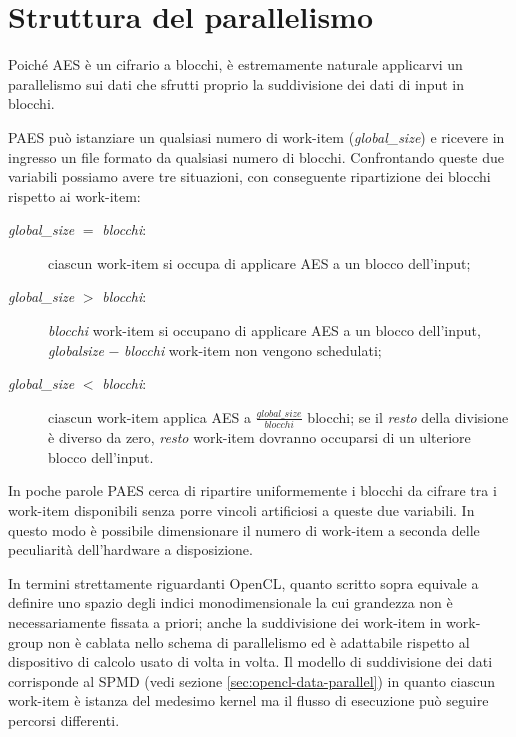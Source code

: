 \documentclass[12pt,a4paper,oneside]{book}
\begin{document}
\section{Struttura del parallelismo}
\label{sec:paes-parallelism}

Poiché \ac{AES} è un cifrario a blocchi, è estremamente naturale applicarvi un parallelismo sui dati che sfrutti proprio la suddivisione dei dati di input in blocchi.

PAES può istanziare un qualsiasi numero di work-item (\textit{global\_size}) e ricevere in ingresso un file formato da qualsiasi numero di blocchi. Confrontando queste due variabili possiamo avere tre situazioni, con conseguente ripartizione dei blocchi rispetto ai work-item:

\begin{description}
\item[\textit{global\_size} $=$ \textit{blocchi}:] ciascun work-item si occupa di applicare \ac{AES} a un blocco dell'input;
\item[\textit{global\_size} $>$ \textit{blocchi}:] \textit{blocchi} work-item si occupano di applicare \ac{AES} a un blocco dell'input, \textit{globalsize} $-$ \textit{blocchi} work-item non vengono schedulati;
\item[\textit{global\_size} $<$ \textit{blocchi}:] ciascun work-item applica \ac{AES} a $\frac{global\_size}{blocchi}$ blocchi; se il \textit{resto} della divisione è diverso da zero, \textit{resto} work-item dovranno occuparsi di un ulteriore blocco dell'input.
\end{description}

In poche parole PAES cerca di ripartire uniformemente i blocchi da cifrare tra i work-item disponibili senza porre vincoli artificiosi a queste due variabili. In questo modo è possibile dimensionare il numero di work-item a seconda delle peculiarità dell'hardware a disposizione.

In termini strettamente riguardanti \ac{OpenCL}, quanto scritto sopra equivale a definire uno spazio degli indici monodimensionale la cui grandezza non è necessariamente fissata a priori; anche la suddivisione dei work-item in work-group non è cablata nello schema di parallelismo ed è adattabile rispetto al dispositivo di calcolo usato di volta in volta. Il modello di suddivisione dei dati corrisponde al \ac{SPMD} (vedi sezione \ref{sec:opencl-data-parallel}) in quanto ciascun work-item è istanza del medesimo kernel ma il flusso di esecuzione può seguire percorsi differenti.
\end{document}
